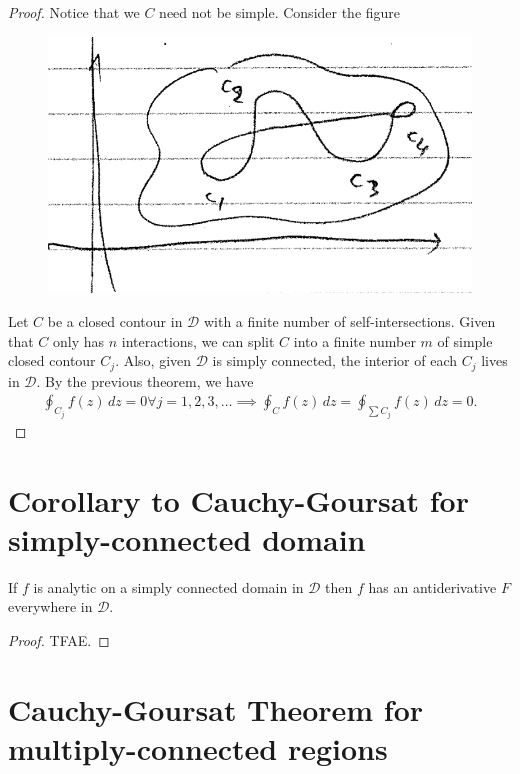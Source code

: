 \documentclass{article}
\theoremstyle{definition}
\begin{document}
\begin{proof}
	Notice that we $C$ need not be simple. Consider the figure

	\begin{figure}[!htb]
		\centering
		\includegraphics[scale=0.25]{C-G-simple}
	\end{figure}


	Let $C$ be a closed contour in $\mathcal{D}$ with a finite number of self-intersections. Given that $C$ only has $n$ interactions, we can split $C$ into a finite number $m$ of simple closed contour $C_j$. Also, given $\mathcal{D}$ is simply connected, the interior of each $C_j$ lives in $\mathcal{D}$. By the previous theorem, we have 
	\begin{align}
	\oint_{C_j}f(z)\,dz = 0 \forall j = 1,2,3,\dots \implies \oint_C f(z)\,dz = \oint_{\sum C_j}f(z)\,dz  = 0.
	\end{align}

\end{proof}


\section{Corollary to Cauchy-Goursat for simply-connected domain}

If $f$ is analytic on a simply connected domain in $\mathcal{D}$ then $f$ has an antiderivative $F$ everywhere in $\mathcal{D}$.

\begin{proof}
	TFAE.
\end{proof}

\section{Cauchy-Goursat Theorem for multiply-connected regions}
\end{document}
